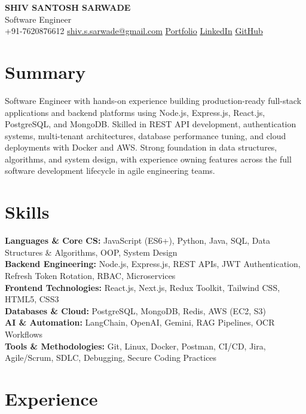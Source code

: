 \documentclass[a4paper,10pt]{article}
\begin{document}
\pagestyle{empty}

\begin{center}
    {\LARGE \textbf{SHIV SANTOSH SARWADE}}\\
    Software Engineer \\[4pt]
    +91-7620876612 \quad
    \href{mailto:shiv.s.sarwade@gmail.com}{shiv.s.sarwade@gmail.com} \quad
    \href{https://www.shivsarwade.space}{Portfolio} \quad
    \href{https://linkedin.com/in/shiv-sarwade}{LinkedIn} \quad
    \href{https://github.com/ShivSarwade}{GitHub}
\end{center}

\section*{Summary}

Software Engineer with hands-on experience building production-ready full-stack applications and backend platforms using Node.js, Express.js, React.js, PostgreSQL, and MongoDB. Skilled in REST API development, authentication systems, multi-tenant architectures, database performance tuning, and cloud deployments with Docker and AWS. Strong foundation in data structures, algorithms, and system design, with experience owning features across the full software development lifecycle in agile engineering teams.

\section*{Skills}

\textbf{Languages \& Core CS:} JavaScript (ES6+), Python, Java, SQL, Data Structures \& Algorithms, OOP, System Design\\[2pt]
\textbf{Backend Engineering:} Node.js, Express.js, REST APIs, JWT Authentication, Refresh Token Rotation, RBAC, Microservices\\[2pt]
\textbf{Frontend Technologies:} React.js, Next.js, Redux Toolkit, Tailwind CSS, HTML5, CSS3\\[2pt]
\textbf{Databases \& Cloud:} PostgreSQL, MongoDB, Redis, AWS (EC2, S3)\\[2pt]
\textbf{AI \& Automation:} LangChain, OpenAI, Gemini, RAG Pipelines, OCR Workflows\\[2pt]
\textbf{Tools \& Methodologies:} Git, Linux, Docker, Postman, CI/CD, Jira, Agile/Scrum, SDLC, Debugging, Secure Coding Practices

\section*{Experience}
\end{document}

